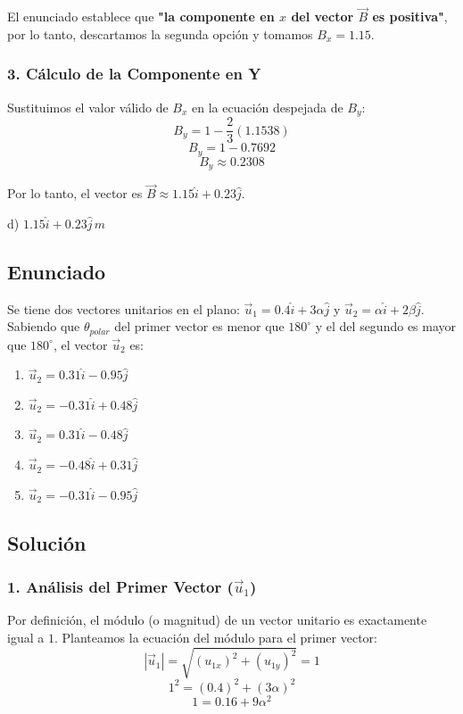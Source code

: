 \documentclass[12pt, a4paper]{article}
\begin{document}
El enunciado establece que \textbf{"la componente en $x$ del vector $\vec{B}$ es positiva"}, por lo tanto, descartamos la segunda opción y tomamos $B_x = 1.15$.

\subsubsection*{3. Cálculo de la Componente en Y}
Sustituimos el valor válido de $B_x$ en la ecuación despejada de $B_y$:
$$ B_y = 1 - \frac{2}{3}(1.1538) $$
$$ B_y = 1 - 0.7692 $$
$$ B_y \approx 0.2308 $$

Por lo tanto, el vector es $\vec{B} \approx 1.15\hat{i} + 0.23\hat{j}$.

\begin{tcolorbox}[colback=green!5!white, colframe=green!50!black, title=Respuesta Final]
\centering \Large d) $1.15\hat{i} + 0.23\hat{j} \, \si{m}$
\end{tcolorbox}

\newpage

\subsection*{Enunciado}
Se tiene dos vectores unitarios en el plano: $\vec{u}_1 = 0.4\hat{i} + 3\alpha\hat{j}$ y $\vec{u}_2 = \alpha\hat{i} + 2\beta\hat{j}$. Sabiendo que $\theta_{polar}$ del primer vector es menor que $180^\circ$ y el del segundo es mayor que $180^\circ$, el vector $\vec{u}_2$ es:

\begin{enumerate}[label=\alph*)]
    \item $\vec{u}_2 = 0.31\hat{i} - 0.95\hat{j}$
    \item $\vec{u}_2 = -0.31\hat{i} + 0.48\hat{j}$
    \item $\vec{u}_2 = 0.31\hat{i} - 0.48\hat{j}$
    \item $\vec{u}_2 = -0.48\hat{i} + 0.31\hat{j}$
    \item $\vec{u}_2 = -0.31\hat{i} - 0.95\hat{j}$
\end{enumerate}

\subsection*{Solución}

\subsubsection*{1. Análisis del Primer Vector ($\vec{u}_1$)}
Por definición, el módulo (o magnitud) de un vector unitario es exactamente igual a $1$. Planteamos la ecuación del módulo para el primer vector:
$$|\vec{u}_1| = \sqrt{(u_{1x})^2 + (u_{1y})^2} = 1$$
$$1^2 = (0.4)^2 + (3\alpha)^2$$
$$1 = 0.16 + 9\alpha^2$$
\end{document}
